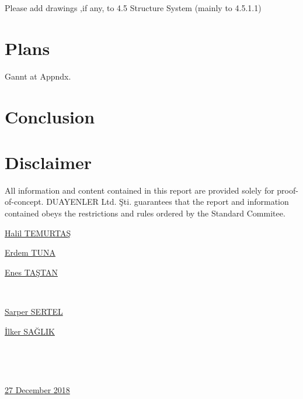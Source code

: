 \documentclass[a4paper,12pt]{article}
\begin{document}
	Please add drawings ,if any, to 4.5 Structure System (mainly to 4.5.1.1)
	
	
	
	\section{Plans}
	
	Gannt at Appndx.
	
	
	\section{Conclusion}
	
	\newpage
\begin{appendices}
	
		
		

	
\end{appendices}

	
	
	\newpage
	\section{Disclaimer}
	\vspace{1cm}
	
	\textsf{ All information and content contained in this report are provided solely for proof-of-concept. DUAYENLER Ltd. Şti. guarantees that the report and information contained obeys the restrictions and rules ordered by the Standard Commitee.}
	
	\vspace{1cm}
	

\begin{minipage}[b]{0.33\linewidth}
\centering
\underline{Halil TEMURTAŞ}
\end{minipage}%
\begin{minipage}[b]{0.33\linewidth}
\centering
\underline{Erdem TUNA}
\end{minipage}%
\begin{minipage}[b]{0.33\linewidth}
\centering
\underline{Enes TAŞTAN}
\end{minipage} \\[2.5cm]

\begin{minipage}[b]{0.495\linewidth}
\centering
\underline{Sarper SERTEL}
\end{minipage}%
\begin{minipage}[b]{0.495\linewidth}
\centering
\underline{İlker SAĞLIK}
\end{minipage}\\[2.5cm]

\begin{minipage}[b]{0.745\linewidth}
\centering
~~
\end{minipage}%
\begin{minipage}[b]{0.25\linewidth}
\centering
\underline{27 December 2018}
\end{minipage}



	
	
	
\end{document}
